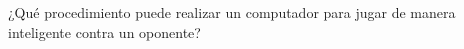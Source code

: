 \documentclass[preview]{standalone}
\begin{document}
\begin{center}
¿Qué procedimiento puede realizar un computador 
         para jugar de manera inteligente contra un oponente?
\end{center}
\end{document}
